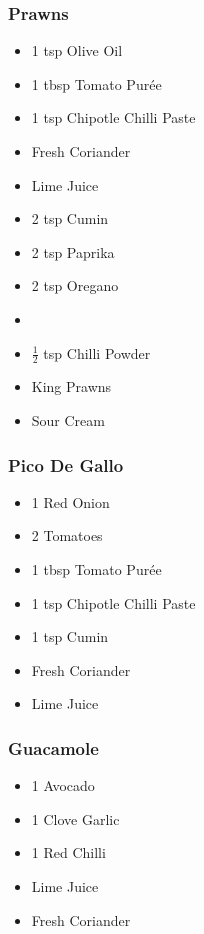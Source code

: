 \documentclass[11pt, english]{article}
\begin{document}
		\subsubsection*{Prawns}

	\begin{itemize}
        \setlength\itemsep{0cm}
                \item 1 tsp Olive Oil
		\item 1 tbsp Tomato Pur\'{e}e
		\item 1 tsp Chipotle Chilli Paste
		\item Fresh Coriander
		\item Lime Juice
		\item 2 tsp Cumin
		\item 2 tsp Paprika
		\item 2 tsp Oregano
		\item \item $\frac{1}{2}$ tsp Chilli Powder
		\item King Prawns
		\item Sour Cream
        \end{itemize}
	
		\subsubsection*{Pico De Gallo}
	
	\begin{itemize}
        \setlength\itemsep{0cm}
                \item 1 Red Onion
		\item 2 Tomatoes
		\item 1 tbsp Tomato Pur\'{e}e
		\item 1 tsp Chipotle Chilli Paste
		\item 1 tsp Cumin
		\item Fresh Coriander
		\item Lime Juice
        \end{itemize}

		\subsubsection*{Guacamole}

	\begin{itemize}
        \setlength\itemsep{0cm}
                \item 1 Avocado
		\item 1 Clove Garlic
		\item 1 Red Chilli
		\item Lime Juice
		\item Fresh Coriander
        \end{itemize}
\end{document}
